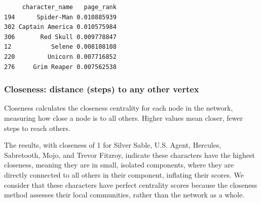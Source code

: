 \documentclass[
  letterpaper,
  DIV=11,
  numbers=noendperiod]{scrartcl}
\newenvironment{Shaded}{\begin{snugshade}}{\end{snugshade}}
\newcommand{\AttributeTok}[1]{\textcolor[rgb]{0.40,0.45,0.13}{#1}}
\newcommand{\CommentTok}[1]{\textcolor[rgb]{0.37,0.37,0.37}{#1}}
\newcommand{\ConstantTok}[1]{\textcolor[rgb]{0.56,0.35,0.01}{#1}}
\newcommand{\DecValTok}[1]{\textcolor[rgb]{0.68,0.00,0.00}{#1}}
\newcommand{\FunctionTok}[1]{\textcolor[rgb]{0.28,0.35,0.67}{#1}}
\newcommand{\NormalTok}[1]{\textcolor[rgb]{0.00,0.23,0.31}{#1}}
\newcommand{\OtherTok}[1]{\textcolor[rgb]{0.00,0.23,0.31}{#1}}
\newcommand{\SpecialCharTok}[1]{\textcolor[rgb]{0.37,0.37,0.37}{#1}}
\begin{document}
\begin{verbatim}
     character_name   page_rank
194      Spider-Man 0.010885939
302 Captain America 0.010575984
306       Red Skull 0.009778847
12           Selene 0.008108108
220         Unicorn 0.007716852
276     Grim Reaper 0.007562538
\end{verbatim}

\subsubsection{Closeness: distance (steps) to any other
vertex}\label{closeness-distance-steps-to-any-other-vertex}

Closeness calculates the closeness centrality for each node in the
network, measuring how close a node is to all others. Higher values mean
closer, fewer steps to reach others.

The results, with closeness of 1 for Silver Sable, U.S. Agent, Hercules,
Sabretooth, Mojo, and Trevor Fitzroy, indicate these characters have the
highest closeness, meaning they are in small, isolated components, where
they are directly connected to all others in their component, inflating
their scores. We consider that these characters have perfect centrality
scores because the closeness method assesses their local communities,
rather than the network as a whole.

\begin{Shaded}
\end{Shaded}
\end{document}

